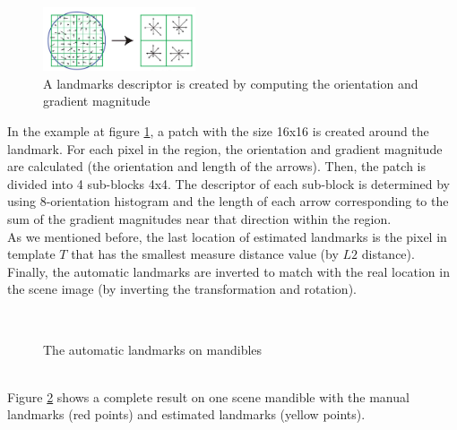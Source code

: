\documentclass[twoside,twocolumn,10pt]{article}
\begin{document}
\begin{figure}[htb]
    \centering
    \includegraphics[width=0.4\textwidth]{./images/keypoint_descriptor}
    \caption{A landmarks descriptor is created by computing the orientation and gradient magnitude}
    \label{fig:kpdescriptor}
\end{figure}

In the example at figure \ref{fig:kpdescriptor}, a patch with the size 16x16 is created around the landmark. For each pixel in the region, the orientation and gradient magnitude are calculated (the orientation and length of the arrows). Then, the patch is divided into 4 sub-blocks 4x4. The descriptor of each sub-block is determined by using 8-orientation histogram and the length of each arrow corresponding to the sum of the gradient magnitudes near that direction within the region.\\

As we mentioned before, the last location of
estimated landmarks is the pixel in template \textit{$T$} that has the smallest measure distance value (by $L2$ distance). Finally, the automatic landmarks are inverted to match with the real location in the scene image (by inverting the transformation and rotation).\\
\begin{figure}[h]
\centering
{}~~
\caption{The automatic landmarks on mandibles}
\label{figresult}
\end{figure}~\\
Figure \ref{figresult} shows a complete result on one scene mandible with the manual landmarks (red points) and estimated landmarks (yellow points). 
\end{document}
